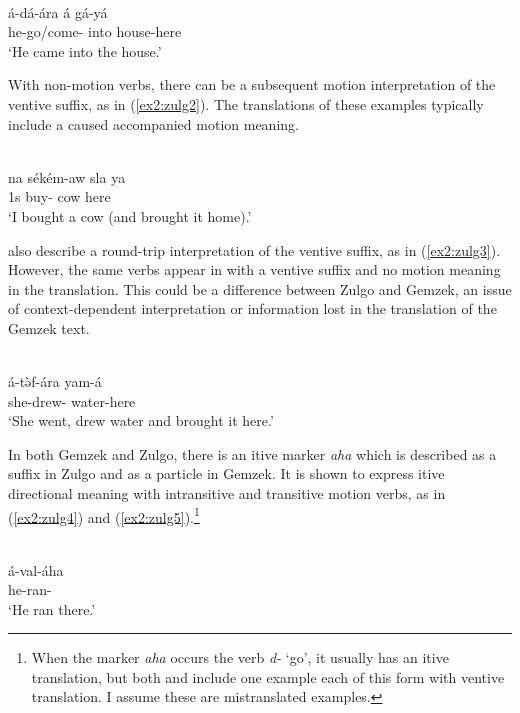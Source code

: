 \ea\label{ex2:zulg1}
 \\
\gll  á-dá-ára á gá-yá \\
he-go/come- into house-here \\
\glt `He came into the house.'
\z 

With non-motion verbs, there can be a subsequent motion interpretation of the ventive suffix, as in (\ref{ex2:zulg2}). The translations of these examples typically include a caused accompanied motion meaning.

\ea\label{ex2:zulg2}
 \\
\gll na sékém-aw sla ya\\
1s buy- cow here	\\
\glt `I bought a cow (and brought it home).'
\z 

\citet{hallerVerbalComplexZulgo1981} also describe a round-trip interpretation of the ventive suffix, as in (\ref{ex2:zulg3}). However, the same verbs appear in \citet{scherrerOverviewGemzekNarrative2012} with a ventive suffix and no motion meaning in the translation. This could be a difference between Zulgo and Gemzek, an issue of context-dependent interpretation or information lost in the translation of the Gemzek text. 

\ea\label{ex2:zulg3}
 \\
\gll á-tə̀f-ára yam-á \\
she-drew- water-here \\
\glt `She went, drew water and brought it here.'
\z 

In both Gemzek and Zulgo, there is an itive marker \textit{aha} which is described as a suffix in Zulgo and as a particle in Gemzek. It is shown to express itive directional meaning with intransitive and transitive motion verbs, as in (\ref{ex2:zulg4}) and (\ref{ex2:zulg5}).\footnote{When the marker \textit{aha} occurs the verb \textit{d-} `go', it usually  has an itive translation, but both \citet[47]{hallerVerbalComplexZulgo1981} and \citet[18]{gravinaOutlineSketchGemzek2005} include one example each of this form with ventive translation. I assume these are mistranslated examples.}

\ea\label{ex2:zulg4}
 \\
\gll á-val-áha \\
he-ran- \\
\glt `He ran there.'

